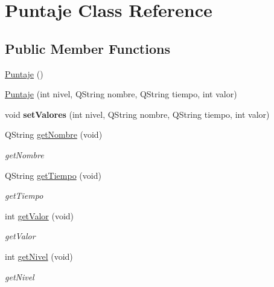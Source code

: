 \hypertarget{class_puntaje}{\section{Puntaje Class Reference}
\label{class_puntaje}
}
\subsection*{Public Member Functions}
\begin{DoxyCompactItemize}
\item 
\hyperlink{class_puntaje_a3414fcbb7cd0753464c60d03f17b5512}{Puntaje} ()
\item 
\hyperlink{class_puntaje_adf12fc4d5bfa771251cfdb777c747b5d}{Puntaje} (int nivel, Q\-String nombre, Q\-String tiempo, int valor)
\item 
\hypertarget{class_puntaje_adcf607cfc5044a6fbb467979992ef2f4}{void {\bfseries set\-Valores} (int nivel, Q\-String nombre, Q\-String tiempo, int valor)}\label{class_puntaje_adcf607cfc5044a6fbb467979992ef2f4}

\item 
Q\-String \hyperlink{class_puntaje_af098b8673503572df2a530d25712e5e8}{get\-Nombre} (void)
\begin{DoxyCompactList}\small\item\em get\-Nombre \end{DoxyCompactList}\item 
Q\-String \hyperlink{class_puntaje_ac18111ec8685e9fecad20571dc14df3b}{get\-Tiempo} (void)
\begin{DoxyCompactList}\small\item\em get\-Tiempo \end{DoxyCompactList}\item 
int \hyperlink{class_puntaje_aed12d5639a572b00de253b9170fde03f}{get\-Valor} (void)
\begin{DoxyCompactList}\small\item\em get\-Valor \end{DoxyCompactList}\item 
int \hyperlink{class_puntaje_a35b6adcad7bbddf7f38faa0c8de8bd5a}{get\-Nivel} (void)
\begin{DoxyCompactList}\small\item\em get\-Nivel \end{DoxyCompactList}\end{DoxyCompactItemize}


